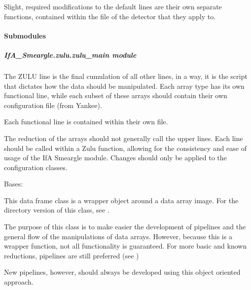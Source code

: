 \documentclass[letterpaper,10pt,english]{sphinxmanual}
\begin{document}
Slight, required modifications to the default lines are their own separate
functions, contained within the file of the detector that they apply to.


\paragraph{Submodules}
\label{\detokenize{python_docstrings/IfA_Smeargle.zulu:submodules}}

\subparagraph{IfA\_Smeargle.zulu.zulu\_main module}
\label{\detokenize{python_docstrings/IfA_Smeargle.zulu.zulu_main:module-IfA_Smeargle.zulu.zulu_main}}\label{\detokenize{python_docstrings/IfA_Smeargle.zulu.zulu_main:ifa-smeargle-zulu-zulu-main-module}}\label{\detokenize{python_docstrings/IfA_Smeargle.zulu.zulu_main::doc}}
The ZULU line is the final cumulation of all other lines, in a way, it is
the script that dictates how the data should be manipulated. Each array
type has its own functional line, while each subset of these arrays should
contain their own configuration file (from Yankee).

Each functional line is contained within their own file.

The reduction of the arrays should not generally call the upper lines.
Each line should be called within a Zulu function, allowing for the
consistency and ease of usage of the IfA Smeargle module. Changes should
only be applied to the configuration classes.

\begin{fulllineitems}
\label{\detokenize{python_docstrings/IfA_Smeargle.zulu.zulu_main:IfA_Smeargle.zulu.zulu_main.IfasDataArray}}
Bases: 

This data frame class is a wrapper object around a data array image.
For the directory version of this class, see
.

The purpose of this class is to make easier the development of pipelines
and the general flow of the manipulations of data arrays. However, because
this is a wrapper function, not all functionality is guaranteed. For
more basic and known reductions, pipelines are still preferred (see
{\hyperref[\detokenize{python_docstrings/IfA_Smeargle.zulu.detector_pipelines::doc}]{}})

New pipelines, however, should always be developed using this object
oriented approach.

\end{fulllineitems}
\end{document}
